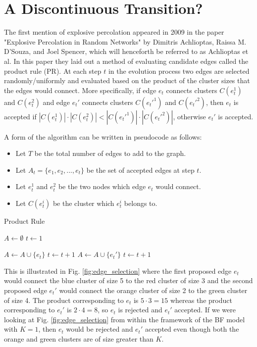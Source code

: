 \section{A Discontinuous Transition?}
The first mention of explosive percolation appeared in 2009 in the paper "Explosive Percolation in Random Networks" \cite{Achlioptas_1} by Dimitris Achlioptas, Raissa M. D’Souza, and Joel Spencer, which will henceforth be referred to as Achlioptas et al.
In this paper they laid out a method of evaluating candidate edges called the product rule (PR).
At each step $t$ in the evolution process two edges are selected randomly/uniformly and evaluated based on the product of the cluster sizes that the edges would connect.
More specifically, if edge $e_t$ connects clusters $C(e_t^1)$ and $C(e_t^2)$ and edge $e_t'$ connects clusters $C(e_t'^1)$ and $C(e_t'^2)$, then $e_t$ is accepted if $|C(e_t^1)| \cdot |C(e_t^2)| < |C(e_t'^1)| \cdot |C(e_t'^2)|$, otherwise $e_t'$ is accepted.

A form of the algorithm can be written in pseudocode as follows:
\begin{itemize}
	\item Let $T$ be the total number of edges to add to the graph.
	\item Let $A_t = \{e_1, e_2, ..., e_t\}$ be the set of accepted edges at step $t$.
	\item Let $e_t^1$ and $e_t^2$ be the two nodes which edge $e_t$ would connect.
	\item Let $C(e_t^i)$ be the cluster which $e_t^i$ belongs to.
\end{itemize}

\begin{algorithm}
	\caption{Product Rule}\label{Product-Rule}
	\begin{algorithmic}[1]
		\State $A \gets \emptyset$
		\State $t \gets 1$

				\State $A \gets A \cup \{e_t\}$
				\State $t \gets t+1$
			\Else
				\State $A \gets A \cup \{e_t'\}$
				\State $t \gets t+1$
			\EndIf
		\EndWhile
	\EndProcedure
	\end{algorithmic}
\end{algorithm}

This is illustrated in Fig. \ref{fig:edge_selection} where the first proposed edge $e_t$ would connect the blue cluster of size 5 to the red cluster of size 3 and the second proposed edge $e_t'$ would connect the orange cluster of size 2 to the green cluster of size 4.
The product corresponding to $e_t$ is $5 \cdot 3 = 15$ whereas the product corresponding to $e_t'$ is $2 \cdot 4 = 8$, so $e_t$ is rejected and $e_t'$ accepted.
If we were looking at Fig. \ref{fig:edge_selection} from within the framework of the BF model with $K = 1$, then $e_t$ would be rejected and $e_t'$ accepted even though both the orange and green clusters are of size greater than $K$.

